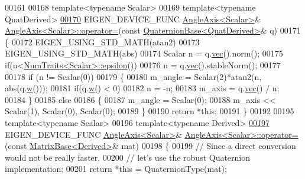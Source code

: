 \begin{DoxyCode}
00161 
00168 \textcolor{keyword}{template}<\textcolor{keyword}{typename} Scalar>
00169 \textcolor{keyword}{template}<\textcolor{keyword}{typename} QuatDerived>
\hyperlink{group___geometry___module_ae2457ed2c03f5050f03e1f89e420ae9d}{00170} EIGEN\_DEVICE\_FUNC \hyperlink{group___geometry___module_class_eigen_1_1_angle_axis}{AngleAxis<Scalar>}& 
      \hyperlink{group___geometry___module_class_eigen_1_1_angle_axis}{AngleAxis<Scalar>::operator=}(\textcolor{keyword}{const} 
      \hyperlink{group___geometry___module_class_eigen_1_1_quaternion_base}{QuaternionBase<QuatDerived>}& q)
00171 \{
00172   EIGEN\_USING\_STD\_MATH(atan2)
00173   EIGEN\_USING\_STD\_MATH(abs)
00174   Scalar n = q.\hyperlink{group___geometry___module_aa8a52640dfd34f910d18f110ccccd1b9}{vec}().norm();
00175   \textcolor{keywordflow}{if}(n<\hyperlink{group___core___module_struct_eigen_1_1_num_traits}{NumTraits<Scalar>::epsilon}())
00176     n = q.\hyperlink{group___geometry___module_aa8a52640dfd34f910d18f110ccccd1b9}{vec}().stableNorm();
00177 
00178   \textcolor{keywordflow}{if} (n != Scalar(0))
00179   \{
00180     m\_angle = Scalar(2)*atan2(n, abs(q.\hyperlink{group___geometry___module_a1f3f580927483150d4558c327988a9b4}{w}()));
00181     \textcolor{keywordflow}{if}(q.\hyperlink{group___geometry___module_a1f3f580927483150d4558c327988a9b4}{w}() < 0)
00182       n = -n;
00183     m\_axis  = q.\hyperlink{group___geometry___module_aa8a52640dfd34f910d18f110ccccd1b9}{vec}() / n;
00184   \}
00185   \textcolor{keywordflow}{else}
00186   \{
00187     m\_angle = Scalar(0);
00188     m\_axis << Scalar(1), Scalar(0), Scalar(0);
00189   \}
00190   \textcolor{keywordflow}{return} *\textcolor{keyword}{this};
00191 \}
00192 
00195 \textcolor{keyword}{template}<\textcolor{keyword}{typename} Scalar>
00196 \textcolor{keyword}{template}<\textcolor{keyword}{typename} Derived>
\hyperlink{group___geometry___module_a8fb625bf0eb611f52ac1a232cb39f731}{00197} EIGEN\_DEVICE\_FUNC \hyperlink{group___geometry___module_class_eigen_1_1_angle_axis}{AngleAxis<Scalar>}& 
      \hyperlink{group___geometry___module_class_eigen_1_1_angle_axis}{AngleAxis<Scalar>::operator=}(\textcolor{keyword}{const} 
      \hyperlink{group___core___module_class_eigen_1_1_matrix_base}{MatrixBase<Derived>}& mat)
00198 \{
00199   \textcolor{comment}{// Since a direct conversion would not be really faster,}
00200   \textcolor{comment}{// let's use the robust Quaternion implementation:}
00201   \textcolor{keywordflow}{return} *\textcolor{keyword}{this} = QuaternionType(mat);

\end{DoxyCode}
